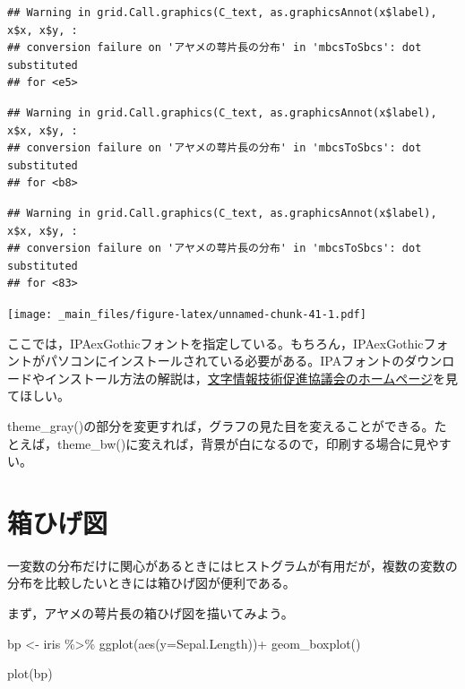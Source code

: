 \documentclass[
]{book}
\newenvironment{Shaded}{\begin{snugshade}}{\end{snugshade}}
\newcommand{\AttributeTok}[1]{\textcolor[rgb]{0.77,0.63,0.00}{#1}}
\newcommand{\FunctionTok}[1]{\textcolor[rgb]{0.00,0.00,0.00}{#1}}
\newcommand{\NormalTok}[1]{#1}
\newcommand{\OtherTok}[1]{\textcolor[rgb]{0.56,0.35,0.01}{#1}}
\newcommand{\SpecialCharTok}[1]{\textcolor[rgb]{0.00,0.00,0.00}{#1}}
\begin{document}
\begin{verbatim}
## Warning in grid.Call.graphics(C_text, as.graphicsAnnot(x$label), x$x, x$y, :
## conversion failure on 'アヤメの萼片長の分布' in 'mbcsToSbcs': dot substituted
## for <e5>
\end{verbatim}

\begin{verbatim}
## Warning in grid.Call.graphics(C_text, as.graphicsAnnot(x$label), x$x, x$y, :
## conversion failure on 'アヤメの萼片長の分布' in 'mbcsToSbcs': dot substituted
## for <b8>
\end{verbatim}

\begin{verbatim}
## Warning in grid.Call.graphics(C_text, as.graphicsAnnot(x$label), x$x, x$y, :
## conversion failure on 'アヤメの萼片長の分布' in 'mbcsToSbcs': dot substituted
## for <83>
\end{verbatim}

\texttt{[image: \_main\_files/figure-latex/unnamed-chunk-41-1.pdf]}

ここでは，IPAexGothicフォントを指定している。もちろん，IPAexGothicフォントがパソコンにインストールされている必要がある。IPAフォントのダウンロードやインストール方法の解説は，\href{https://moji.or.jp/ipafont/}{文字情報技術促進協議会のホームページ}を見てほしい。

theme\_gray()の部分を変更すれば，グラフの見た目を変えることができる。たとえば，theme\_bw()に変えれば，背景が白になるので，印刷する場合に見やすい。

\hypertarget{ux7bb1ux3072ux3052ux56f3}{%
\section{箱ひげ図}\label{ux7bb1ux3072ux3052ux56f3}}

一変数の分布だけに関心があるときにはヒストグラムが有用だが，複数の変数の分布を比較したいときには箱ひげ図が便利である。

まず，アヤメの萼片長の箱ひげ図を描いてみよう。

\begin{Shaded}
\begin{Highlighting}[]
\NormalTok{bp }\OtherTok{\textless{}{-}}\NormalTok{ iris }\SpecialCharTok{\%\textgreater{}\%} 
  \FunctionTok{ggplot}\NormalTok{(}\FunctionTok{aes}\NormalTok{(}\AttributeTok{y=}\NormalTok{Sepal.Length))}\SpecialCharTok{+}
  \FunctionTok{geom\_boxplot}\NormalTok{()}

\FunctionTok{plot}\NormalTok{(bp)}
\end{Highlighting}
\end{Shaded}
\end{document}
